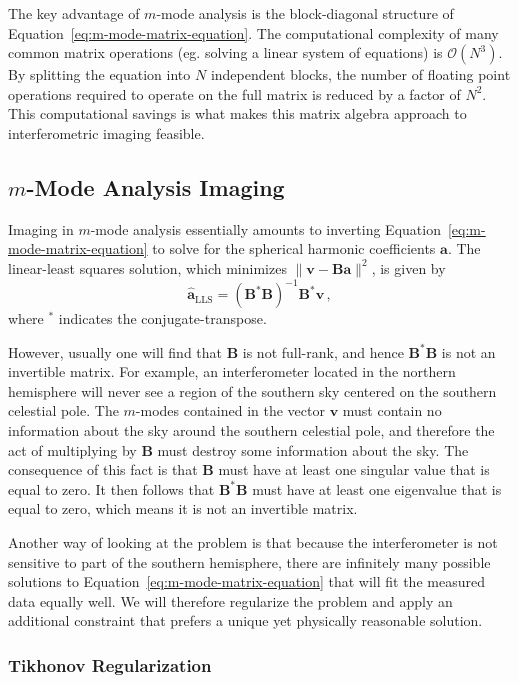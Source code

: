 \documentclass[twocolumn]{aastex61}
\renewcommand{\b}{\pmb}
\begin{document}
The key advantage of $m$-mode analysis is the block-diagonal structure of
Equation~\ref{eq:m-mode-matrix-equation}. The computational complexity of many common matrix
operations (eg. solving a linear system of equations) is $\mathcal{O}(N^3)$.  By splitting the
equation into $N$ independent blocks, the number of floating point operations required to operate on
the full matrix is reduced by a factor of $N^2$. This computational savings is what makes this
matrix algebra approach to interferometric imaging feasible.

\subsection{$m$-Mode Analysis Imaging}\label{sec:mmode-imaging}

Imaging in $m$-mode analysis essentially amounts to inverting
Equation~\ref{eq:m-mode-matrix-equation} to solve for the spherical harmonic coefficients $\b a$.
The linear-least squares solution, which minimizes $\|\b v - \b B\b a\|^2$, is given by
\begin{equation}
    \b{\hat a}_\text{LLS} = (\b B^*\b B)^{-1}\b B^*\b v\,,
\end{equation}
where $^*$ indicates the conjugate-transpose.

However, usually one will find that $\b B$ is not full-rank, and hence $\b B^*\b B$ is not an
invertible matrix. For example, an interferometer located in the northern hemisphere will never see
a region of the southern sky centered on the southern celestial pole. The $m$-modes contained in the
vector $\b v$ must contain no information about the sky around the southern celestial pole, and
therefore the act of multiplying by $\b B$ must destroy some information about the sky. The
consequence of this fact is that $\b B$ must have at least one singular value that is equal to zero.
It then follows that $\b B^*\b B$ must have at least one eigenvalue that is equal to zero, which
means it is not an invertible matrix.

Another way of looking at the problem is that because the interferometer is not sensitive to part of
the southern hemisphere, there are infinitely many possible solutions to
Equation~\ref{eq:m-mode-matrix-equation} that will fit the measured data equally well.  We will
therefore regularize the problem and apply an additional constraint that prefers a unique yet
physically reasonable solution.

\subsubsection{Tikhonov Regularization}
\end{document}

